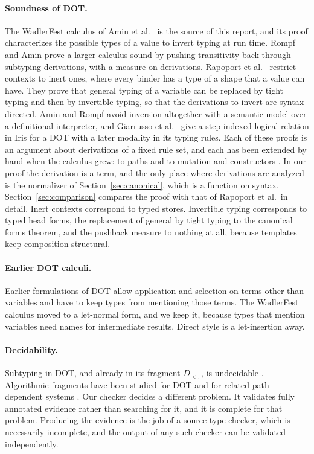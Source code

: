 \paragraph{Soundness of DOT.}
The WadlerFest calculus of Amin et al.\ \cite{amin2016essence} is the source of this report, and its proof characterizes the possible types of a value to invert typing at run time. Rompf and Amin \cite{rompf2016soundness} prove a larger calculus sound by pushing transitivity back through subtyping derivations, with a measure on derivations. Rapoport et al.\ \cite{rapoport2017simple} restrict contexts to inert ones, where every binder has a type of a shape that a value can have. They prove that general typing of a variable can be replaced by tight typing and then by invertible typing, so that the derivations to invert are syntax directed. Amin and Rompf \cite{amin2017definitional} avoid inversion altogether with a semantic model over a definitional interpreter, and Giarrusso et al.\ \cite{giarrusso2020scala} give a step-indexed logical relation in Iris for a DOT with a later modality in its typing rules. Each of these proofs is an argument about derivations of a fixed rule set, and each has been extended by hand when the calculus grew: to paths \cite{rapoport2019path} and to mutation and constructors \cite{kabir2018kdot}. In our proof the derivation is a term, and the only place where derivations are analyzed is the normalizer of Section~\ref{sec:canonical}, which is a function on syntax. Section~\ref{sec:comparison} compares the proof with that of Rapoport et al.\ in detail. Inert contexts correspond to typed stores. Invertible typing corresponds to typed head forms, the replacement of general by tight typing to the canonical forms theorem, and the pushback measure to nothing at all, because templates keep composition structural.

\paragraph{Earlier DOT calculi.}
Earlier formulations of DOT \cite{amin2012dot,amin2014foundations} allow application and selection on terms other than variables and have to keep types from mentioning those terms. The WadlerFest calculus moved to a let-normal form, and we keep it, because types that mention variables need names for intermediate results. Direct style is a let-insertion away.

\paragraph{Decidability.}
Subtyping in DOT, and already in its fragment $D_{<:}$, is undecidable \cite{hu2020undecidability}. Algorithmic fragments have been studied for DOT \cite{nieto2017algorithmic} and for related path-dependent systems \cite{mackay2020decidable}. Our checker decides a different problem. It validates fully annotated evidence rather than searching for it, and it is complete for that problem. Producing the evidence is the job of a source type checker, which is necessarily incomplete, and the output of any such checker can be validated independently.

